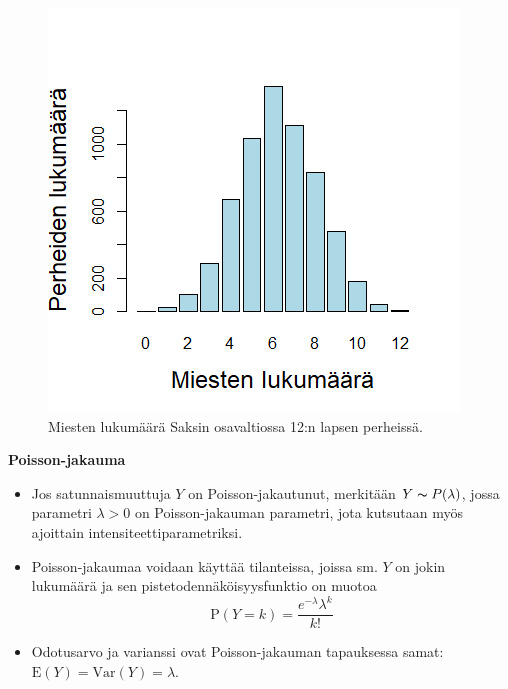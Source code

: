 \documentclass[
]{book}
\begin{document}
\begin{figure}

{\centering \includegraphics[width=7.5\linewidth]{images/Miesten_lkm} 

}

\caption{Miesten lukumäärä Saksin osavaltiossa 12:n lapsen perheissä.}\label{fig:miestenlkm}
\end{figure}

\FloatBarrier

\textbf{Poisson-jakauma}

\begin{itemize}
\item
  Jos satunnaismuuttuja \(Y\) on Poisson-jakautunut, merkitään \(Y \thicksim P(\lambda)\), jossa parametri \(\lambda > 0\) on Poisson-jakauman parametri, jota kutsutaan myös ajoittain intensiteettiparametriksi.
\item
  Poisson-jakaumaa voidaan käyttää tilanteissa, joissa sm. \(Y\) on jokin lukumäärä ja sen pistetodennäköisyysfunktio on muotoa
  \[
  \text{P}(Y=k) = \frac{e^{-\lambda} \lambda^k}{k!}
  \]
\item
  Odotusarvo ja varianssi ovat Poisson-jakauman tapauksessa samat: \(\text{E}(Y) = \mathrm{Var}(Y) = \lambda\).
\end{itemize}
\end{document}
